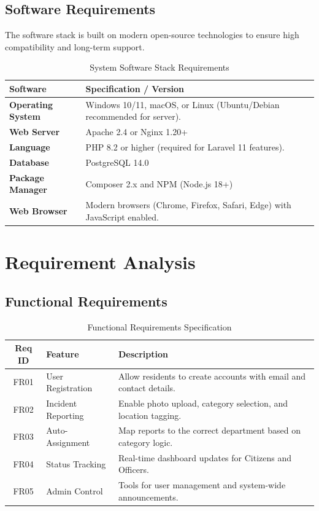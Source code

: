\subsection{Software Requirements}
The software stack is built on modern open-source technologies to ensure high compatibility and long-term support.
\begin{table}[H]
\centering
\renewcommand{\arraystretch}{1.5}
\begin{tabular}{|p{4cm}|p{10cm}|}
\hline
\textbf{Software} & \textbf{Specification / Version} \\ \hline
\textbf{Operating System} & Windows 10/11, macOS, or Linux (Ubuntu/Debian recommended for server). \\ \hline
\textbf{Web Server} & Apache 2.4 or Nginx 1.20+ \\ \hline
\textbf{Language} & PHP 8.2 or higher (required for Laravel 11 features). \\ \hline
\textbf{Database} & PostgreSQL 14.0 \\ \hline
\textbf{Package Manager} & Composer 2.x and NPM (Node.js 18+) \\ \hline
\textbf{Web Browser} & Modern browsers (Chrome, Firefox, Safari, Edge) with JavaScript enabled. \\ \hline
\end{tabular}
\caption{System Software Stack Requirements}
\label{tab:sw_req}
\end{table}

\section{Requirement Analysis}

\subsection{Functional Requirements}
\begin{table}[H]
\centering
\renewcommand{\arraystretch}{1.3}
\begin{tabular}{|c|p{4cm}|p{8cm}|}
\hline
\textbf{Req ID} & \textbf{Feature} & \textbf{Description} \\ \hline
FR01 & User Registration & Allow residents to create accounts with email and contact details. \\ \hline
FR02 & Incident Reporting & Enable photo upload, category selection, and location tagging. \\ \hline
FR03 & Auto-Assignment & Map reports to the correct department based on category logic. \\ \hline
FR04 & Status Tracking & Real-time dashboard updates for Citizens and Officers. \\ \hline
FR05 & Admin Control & Tools for user management and system-wide announcements. \\ \hline
\end{tabular}
\caption{Functional Requirements Specification}
\label{tab:func_req}
\end{table}

